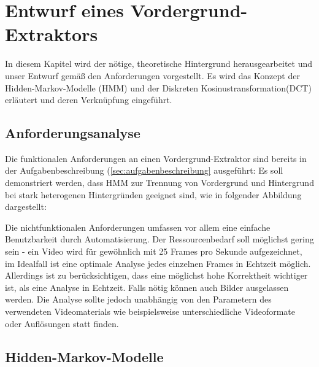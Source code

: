 \section{Entwurf eines Vordergrund-Extraktors}
\label{chap:entwurf}

In diesem Kapitel wird der nötige, theoretische Hintergrund herausgearbeitet und unser Entwurf gemäß den Anforderungen vorgestellt.
Es wird das Konzept der Hidden-Markov-Modelle (HMM) und der Diskreten Kosinustransformation(DCT) erläutert und deren Verknüpfung eingeführt.


\subsection{Anforderungsanalyse}
\label{sec:anforderungsanalyse}

Die funktionalen Anforderungen an einen Vordergrund-Extraktor sind bereits in der Aufgabenbeschreibung (\ref{sec:aufgabenbeschreibung} ausgeführt:
Es soll demonstriert werden, dass HMM zur Trennung von Vordergrund und Hintergrund bei stark heterogenen Hintergründen geeignet sind, wie in folgender Abbildung dargestellt:

Die nichtfunktionalen Anforderungen umfassen vor allem eine einfache Benutzbarkeit durch Automatisierung.
Der Ressourcenbedarf soll möglichst gering sein - ein Video wird für gewöhnlich mit 25 Frames pro Sekunde aufgezeichnet, im Idealfall ist eine optimale Analyse jedes einzelnen Frames in Echtzeit möglich.
Allerdings ist zu berücksichtigen, dass eine möglichst hohe Korrektheit wichtiger ist, als eine Analyse in Echtzeit. Falls nötig können auch Bilder ausgelassen werden.
Die Analyse sollte jedoch unabhängig von den Parametern des verwendeten Videomaterials wie beispielsweise unterschiedliche Videoformate oder Auflösungen statt finden.


\subsection{Hidden-Markov-Modelle}
\label{sec:hiddenmarkovmodel}

